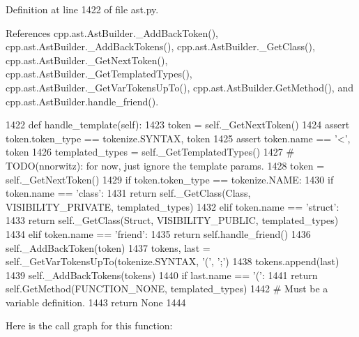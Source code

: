 Definition at line 1422 of file ast.\+py.



References cpp.\+ast.\+Ast\+Builder.\+\_\+\+Add\+Back\+Token(), cpp.\+ast.\+Ast\+Builder.\+\_\+\+Add\+Back\+Tokens(), cpp.\+ast.\+Ast\+Builder.\+\_\+\+Get\+Class(), cpp.\+ast.\+Ast\+Builder.\+\_\+\+Get\+Next\+Token(), cpp.\+ast.\+Ast\+Builder.\+\_\+\+Get\+Templated\+Types(), cpp.\+ast.\+Ast\+Builder.\+\_\+\+Get\+Var\+Tokens\+Up\+To(), cpp.\+ast.\+Ast\+Builder.\+Get\+Method(), and cpp.\+ast.\+Ast\+Builder.\+handle\+\_\+friend().


\begin{DoxyCode}
1422     \textcolor{keyword}{def }handle\_template(self):
1423         token = self.\_GetNextToken()
1424         \textcolor{keyword}{assert} token.token\_type == tokenize.SYNTAX, token
1425         \textcolor{keyword}{assert} token.name == \textcolor{stringliteral}{'<'}, token
1426         templated\_types = self.\_GetTemplatedTypes()
1427         \textcolor{comment}{# TODO(nnorwitz): for now, just ignore the template params.}
1428         token = self.\_GetNextToken()
1429         \textcolor{keywordflow}{if} token.token\_type == tokenize.NAME:
1430             \textcolor{keywordflow}{if} token.name == \textcolor{stringliteral}{'class'}:
1431                 \textcolor{keywordflow}{return} self.\_GetClass(Class, VISIBILITY\_PRIVATE, templated\_types)
1432             \textcolor{keywordflow}{elif} token.name == \textcolor{stringliteral}{'struct'}:
1433                 \textcolor{keywordflow}{return} self.\_GetClass(Struct, VISIBILITY\_PUBLIC, templated\_types)
1434             \textcolor{keywordflow}{elif} token.name == \textcolor{stringliteral}{'friend'}:
1435                 \textcolor{keywordflow}{return} self.handle\_friend()
1436         self.\_AddBackToken(token)
1437         tokens, last = self.\_GetVarTokensUpTo(tokenize.SYNTAX, \textcolor{stringliteral}{'('}, \textcolor{stringliteral}{';'})
1438         tokens.append(last)
1439         self.\_AddBackTokens(tokens)
1440         \textcolor{keywordflow}{if} last.name == \textcolor{stringliteral}{'('}:
1441             \textcolor{keywordflow}{return} self.GetMethod(FUNCTION\_NONE, templated\_types)
1442         \textcolor{comment}{# Must be a variable definition.}
1443         \textcolor{keywordflow}{return} \textcolor{keywordtype}{None}
1444 
\end{DoxyCode}
Here is the call graph for this function\+:
\nopagebreak

